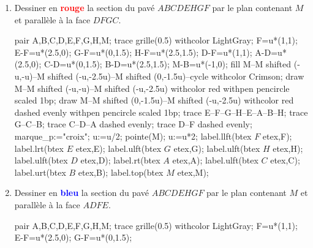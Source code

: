 \begin{corrige}
    \begin{enumerate}
        \item Dessiner en \textcolor{red}{\textbf{rouge}} la section du pavé $ABCDEHGF$ par le plan contenant $M$ et parallèle à la face $DFGC$.
        \begin{center}           
            \begin{Geometrie}[CoinBG={(.5u,.5u)},CoinHD={(5u,4u)}]
                pair A,B,C,D,E,F,G,H,M;
                trace grille(0.5) withcolor LightGray;
                F=u*(1,1);
                E-F=u*(2.5,0);
                G-F=u*(0,1.5);
                H-F=u*(2.5,1.5);
                D-F=u*(1,1);
                A-D=u*(2.5,0);
                C-D=u*(0,1.5);
                B-D=u*(2.5,1.5);
                M-B=u*(-1,0);
                fill M--M shifted (-u,-u)--M shifted (-u,-2.5u)--M shifted (0,-1.5u)--cycle withcolor Crimson;
                draw M--M shifted (-u,-u)--M shifted (-u,-2.5u) withcolor red withpen pencircle scaled 1bp;
                draw M--M shifted (0,-1.5u)--M shifted (-u,-2.5u) withcolor red dashed evenly withpen pencircle scaled 1bp;                
                trace E--F--G--H--E--A--B--H;
                trace G--C--B;
                trace C--D--A dashed evenly;
                trace D--F dashed evenly;
                marque_p:="croix";
                u:=u/2;
                pointe(M);
                u:=u*2;
                label.llft(btex $F$ etex,F);
                label.lrt(btex $E$ etex,E);
                label.ulft(btex $G$ etex,G);
                label.ulft(btex $H$ etex,H);
                label.ulft(btex $D$ etex,D);
                label.rt(btex $A$ etex,A);
                label.ulft(btex $C$ etex,C);
                label.urt(btex $B$ etex,B);
                label.top(btex $M$ etex,M);
            \end{Geometrie}
        \end{center}
        \item Dessiner en \textcolor{blue}{\textbf{bleu}} la section du pavé $ABCDEHGF$ par le plan contenant $M$ et parallèle à la face $ADFE$.
        \begin{center}           
            \begin{Geometrie}[CoinBG={(.5u,.5u)},CoinHD={(5u,4u)}]
                pair A,B,C,D,E,F,G,H,M;
                trace grille(0.5) withcolor LightGray;
                F=u*(1,1);
                E-F=u*(2.5,0);
                G-F=u*(0,1.5);

\end{Geometrie}
\end{center}
\end{enumerate}
\end{corrige}
